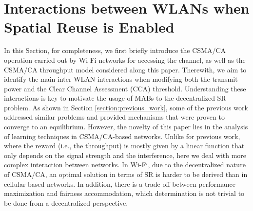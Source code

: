 \documentclass[preprint,12pt]{elsarticle}
\begin{document}
\section{Interactions between WLANs when Spatial Reuse is Enabled}
\label{section:interactions_wlans}    
In this Section, for completeness, we first briefly introduce the CSMA/CA operation carried out by Wi-Fi networks for accessing the channel, as well as the CSMA/CA throughput model considered along this paper. Therewith, we aim to identify the main inter-WLAN interactions when modifying both the transmit power and the Clear Channel Assessment (CCA) threshold. Understanding these interactions is key to motivate the usage of MABs to the decentralized SR problem. As shown in Section \ref{section:previous_work}, some of the previous work addressed similar problems and provided mechanisms that were proven to converge to an equilibrium. However, the novelty of this paper lies in the analysis of learning techniques in CSMA/CA-based networks. Unlike for previous work, where the reward (i.e., the throughput) is mostly given by a linear function that only depends on the signal strength and the interference, here we deal with more complex interaction between networks. In Wi-Fi, due to the decentralized nature of CSMA/CA, an optimal solution in terms of SR is harder to be derived than in cellular-based networks. In addition, there is a trade-off between performance maximization and fairness accommodation, which determination is not trivial to be done from a decentralized perspective.
	
\end{document}
